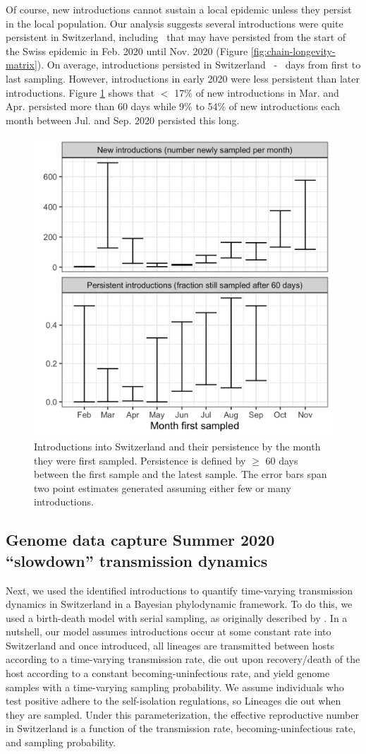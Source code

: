 \documentclass[9pt,twoside,lineno]{pnas-new} %
\begin{document}
Of course, new introductions cannot sustain a local epidemic unless they persist in the local population. Our analysis suggests several introductions were quite persistent in Switzerland, including \nspanningchainsfebnovmin\ that may have persisted from the start of the Swiss epidemic in Feb. 2020 until Nov. 2020 (Figure \ref{fig:chain-longevity-matrix}). On average, introductions persisted in Switzerland \meantimetolastsamplemax\ - \meantimetolastsamplemin\ days from first to last sampling. However, introductions in early 2020 were less persistent than later introductions. Figure \ref{fig:chain-longevity} shows that $<$ 17\% of new introductions in Mar. and Apr. persisted more than 60 days while  9\% to 54\% of new introductions each month between Jul. and Sep. 2020 persisted this long. 

\begin{figure}[H]
\centering
\includegraphics[width=.4\linewidth]{figures/introductions_and_persistance.png}
\caption{Introductions into Switzerland and their persistence by the month they were first sampled. Persistence is defined by $\geq$ 60 days between the first sample and the latest sample. The error bars span two point estimates generated assuming either few or many introductions.}
\label{fig:chain-longevity}
\end{figure}

\subsection{Genome data capture Summer 2020 ``slowdown'' transmission dynamics}

Next, we used the identified introductions to quantify time-varying transmission dynamics in Switzerland in a Bayesian phylodynamic framework. To do this, we used a birth-death model with serial sampling, as originally described by \cite{stadler_2010_bds}. In a nutshell, our model assumes introductions occur at some constant rate into Switzerland and once introduced, all lineages are transmitted between hosts according to a time-varying transmission rate, die out upon recovery/death of the host according to a constant becoming-uninfectious rate, and yield genome samples with a time-varying sampling probability. We assume individuals who test positive adhere to the self-isolation regulations, so Lineages die out when they are sampled. Under this parameterization, the effective reproductive number in Switzerland is a function of the transmission rate, becoming-uninfectious rate, and sampling probability.
\end{document}
